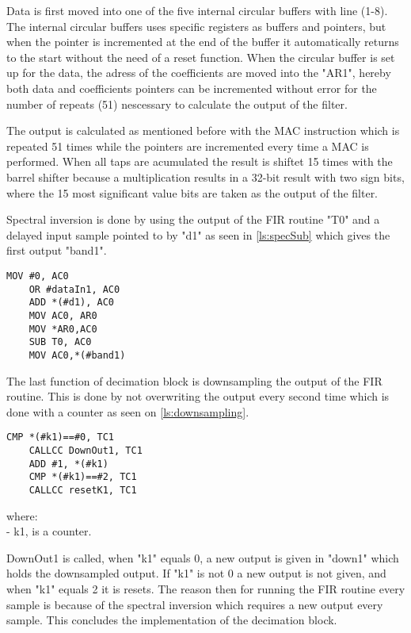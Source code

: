 Data is first moved into one of the five internal circular buffers with line (1-8). The internal circular buffers uses specific registers as buffers and pointers, but when the pointer is incremented at the end of the buffer it automatically returns to the start without the need of a reset function. When the circular buffer is set up for the data, the adress of the coefficients are moved into the "AR1", hereby both data and coefficients pointers can be incremented without error for the number of repeats (51) nescessary to calculate the output of the filter. 

The output is calculated as mentioned before with the MAC instruction which is repeated 51 times while the pointers are incremented every time a MAC is performed. When all taps are acumulated the result is shiftet 15 times with the barrel shifter because a multiplication results in a 32-bit result with two sign bits, where the 15 most significant value bits are taken as the output of the filter.

Spectral inversion is done by using the output of the FIR routine "T0" and a delayed input sample pointed to by "d1" as seen in \autoref{ls:specSub} which gives the first output "band1".

\begin{lstlisting}[language={[x86masm]Assembler}, caption = {Spectral inversion.},label={ls:specSub}]
	MOV #0, AC0
	OR #dataIn1, AC0			
	ADD *(#d1), AC0				
	MOV AC0, AR0
	MOV *AR0,AC0
	SUB T0, AC0
	MOV AC0,*(#band1)
\end{lstlisting}

The last function of decimation block is downsampling the output of the FIR routine. This is done by not overwriting the output every second time which is done with a counter as seen on \autoref{ls:downsampling}.

\begin{lstlisting}[language={[x86masm]Assembler}, caption = {Downsampling.},label={ls:downsampling}]
	CMP *(#k1)==#0, TC1
	CALLCC DownOut1, TC1
	ADD #1, *(#k1)
	CMP *(#k1)==#2, TC1
	CALLCC resetK1, TC1
\end{lstlisting}
where: \\
- k1, is a counter.

DownOut1 is called, when "k1" equals 0, a new output is given in "down1" which holds the downsampled output. If "k1" is not 0 a new output is not given, and when "k1" equals 2 it is resets. The reason then for running the FIR routine every sample is because of the spectral inversion which requires a new output every sample. This concludes the implementation of the decimation block.

